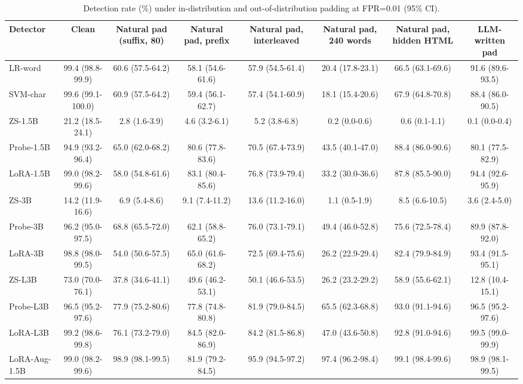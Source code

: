 \begin{table}[t]
\centering
\caption{Detection rate (\%) under in-distribution and out-of-distribution padding at FPR=0.01 (95\% CI).}
\label{tab:ood}
\footnotesize
\begin{tabular}{lccccccc}
\toprule
\textbf{Detector} & \textbf{Clean} & \textbf{Natural pad (suffix, 80)} & \textbf{Natural pad, prefix} & \textbf{Natural pad, interleaved} & \textbf{Natural pad, 240 words} & \textbf{Natural pad, hidden HTML} & \textbf{LLM-written pad} \\
\midrule
LR-word & 99.4 (98.8-99.9) & 60.6 (57.5-64.2) & 58.1 (54.6-61.6) & 57.9 (54.5-61.4) & 20.4 (17.8-23.1) & 66.5 (63.1-69.6) & 91.6 (89.6-93.5) \\
SVM-char & 99.6 (99.1-100.0) & 60.9 (57.5-64.2) & 59.4 (56.1-62.7) & 57.4 (54.1-60.9) & 18.1 (15.4-20.6) & 67.9 (64.8-70.8) & 88.4 (86.0-90.5) \\
ZS-1.5B & 21.2 (18.5-24.1) & 2.8 (1.6-3.9) & 4.6 (3.2-6.1) & 5.2 (3.8-6.8) & 0.2 (0.0-0.6) & 0.6 (0.1-1.1) & 0.1 (0.0-0.4) \\
Probe-1.5B & 94.9 (93.2-96.4) & 65.0 (62.0-68.2) & 80.6 (77.8-83.6) & 70.5 (67.4-73.9) & 43.5 (40.1-47.0) & 88.4 (86.0-90.6) & 80.1 (77.5-82.9) \\
LoRA-1.5B & 99.0 (98.2-99.6) & 58.0 (54.8-61.6) & 83.1 (80.4-85.6) & 76.8 (73.9-79.4) & 33.2 (30.0-36.6) & 87.8 (85.5-90.0) & 94.4 (92.6-95.9) \\
ZS-3B & 14.2 (11.9-16.6) & 6.9 (5.4-8.6) & 9.1 (7.4-11.2) & 13.6 (11.2-16.0) & 1.1 (0.5-1.9) & 8.5 (6.6-10.5) & 3.6 (2.4-5.0) \\
Probe-3B & 96.2 (95.0-97.5) & 68.8 (65.5-72.0) & 62.1 (58.8-65.2) & 76.0 (73.1-79.1) & 49.4 (46.0-52.8) & 75.6 (72.5-78.4) & 89.9 (87.8-92.0) \\
LoRA-3B & 98.8 (98.0-99.5) & 54.0 (50.6-57.5) & 65.0 (61.6-68.2) & 72.5 (69.4-75.6) & 26.2 (22.9-29.4) & 82.4 (79.9-84.9) & 93.4 (91.5-95.1) \\
ZS-L3B & 73.0 (70.0-76.1) & 37.8 (34.6-41.1) & 49.6 (46.2-53.1) & 50.1 (46.6-53.5) & 26.2 (23.2-29.2) & 58.9 (55.6-62.1) & 12.8 (10.4-15.1) \\
Probe-L3B & 96.5 (95.2-97.6) & 77.9 (75.2-80.6) & 77.8 (74.8-80.8) & 81.9 (79.0-84.5) & 65.5 (62.3-68.8) & 93.0 (91.1-94.6) & 96.5 (95.2-97.6) \\
LoRA-L3B & 99.2 (98.6-99.8) & 76.1 (73.2-79.0) & 84.5 (82.0-86.9) & 84.2 (81.5-86.8) & 47.0 (43.6-50.8) & 92.8 (91.0-94.6) & 99.5 (99.0-99.9) \\
LoRA-Aug-1.5B & 99.0 (98.2-99.6) & 98.9 (98.1-99.5) & 81.9 (79.2-84.5) & 95.9 (94.5-97.2) & 97.4 (96.2-98.4) & 99.1 (98.4-99.6) & 98.9 (98.1-99.5) \\

\end{tabular}
\end{table}
